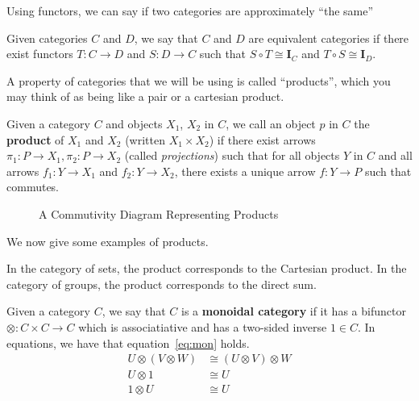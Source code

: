 \documentclass[14pt]{extarticle}  %
\begin{document}
Using functors, we can say if two categories are approximately ``the same''


\begin{defn}
  Given categories $C$ and $D$, we say that $C$ and $D$ are equivalent categories if there exist functors $T : C \to D$ and $S : D \to C$ such that $S \circ T \cong \textbf{I}_{C}$ and $T \circ S \cong \textbf{I}_{D}$.
\end{defn}


A property of categories that we will be using is called ``products'', which you may think of as being like a pair or a cartesian product.

\begin{defn}
  Given a category $C$ and objects $X_{1}$, $X_{2}$ in $C$, we call an object $p$ in $C$ the \textbf{product} of $X_{1}$ and $X_{2}$ (written $X_{1} \times X_{2}$) if there exist arrows
  $\pi_{1} : P \to X_{1}, \pi_{2} : P \to X_{2}$ (called \textit{projections}) such that for all objects $Y$ in $C$ and all arrows $f_{1} : Y \to X_{1}$ and $f_{2} : Y \to X_{2}$, there exists a unique arrow
  $f : Y \to P$ such that  commutes.


  \begin{figure}
\centering
\caption{A Commutivity Diagram Representing Products}
\label{fig:prods}
\end{figure}

We now give some examples of products.
\begin{ex}
  In the category of sets, the product corresponds to the Cartesian product. In the category of groups, the product corresponds to the direct sum.
\end{ex}

\begin{defn}
  Given a category $C$, we say that $C$ is a \textbf{monoidal category} if it has a bifunctor $\otimes : C \times C \to C$ which is associatiative and has a two-sided inverse $1 \in C$. In equations, we have that equation~\ref{eq:mon} holds.
  \begin{align}\label{eq:mon}
    U \otimes (V \otimes W) &\cong (U \otimes V) \otimes W \\
    U \otimes 1 &\cong U \\
    1 \otimes U &\cong U
    \end{align}
\end{defn}


\end{defn}
\end{document}
